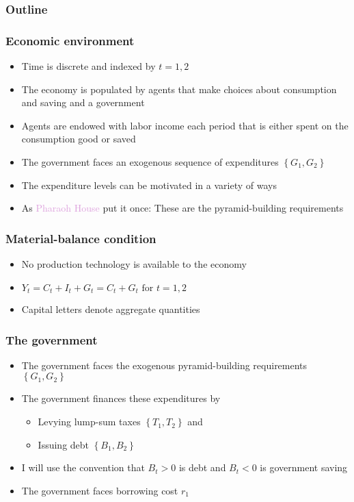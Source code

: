 \documentclass[presentation,dvipsnames]{beamer}
\begin{document}
\begin{frame}
\frametitle{Outline}
\tableofcontents[currentsection]
\end{frame}

\begin{frame}
\frametitle{Economic environment}
\begin{itemize}[label={--}]
\item Time is discrete and indexed by $t=1,2$
\item The economy is populated by agents that make choices about consumption and saving and a government
\item Agents are endowed with labor income each period that is either spent on the consumption good or saved
\item The government faces an exogenous sequence of expenditures $\left\{ G_{1},G_{2} \right\}$
\item The expenditure levels can be motivated in a variety of ways
\item As \textcolor{Plum}{Pharaoh House} put it once: These are the pyramid-building requirements
\end{itemize}
\end{frame}

\begin{frame}
\frametitle{Material-balance condition}
\begin{itemize}[label={--}]
\item No production technology is available to the economy
\item $Y_{t} = C_{t} + I_{t} + G_{t} = C_{t} + G_{t} \text{ for } t=1,2$
\item Capital letters denote aggregate quantities
\end{itemize}
\end{frame}

\begin{frame}
\frametitle{The government}
\begin{itemize}[label={--}]
\item The government faces the exogenous pyramid-building requirements $\left\{ G_{1},G_{2} \right\}$
\item The government finances these expenditures by
\begin{itemize}[label={--}]
\item Levying lump-sum taxes $\left\{ T_{1},T_{2} \right\}$ and
\item Issuing debt $\left\{ B_{1},B_{2} \right\}$
\end{itemize}
\item I will use the convention that $B_{t} > 0$ is debt and $B_{t} < 0$ is government saving
\item The government faces borrowing cost $r_{1}$
\end{itemize}
\end{frame}
\end{document}
